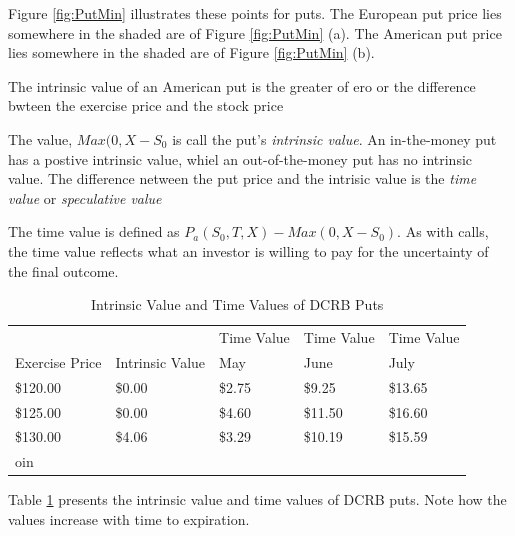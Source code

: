 \documentclass{book}
\theoremstyle{definition}
\theoremstyle{remark}
\begin{document}
            Figure \ref{fig:PutMin} illustrates these points for puts. The European put price lies somewhere in the shaded are of Figure \ref{fig:PutMin} (a). The American put price lies somewhere in the shaded are of Figure \ref{fig:PutMin} (b).
            
        \begin{tcolorbox}[colback=blue!5!white,colframe=blue!75!black, title=Sticky Note]
            The intrinsic value of an American put is the greater of ero or the difference bwteen the exercise price and the stock price 
        \end{tcolorbox} 
           
            The value, $Max(0, X -S_0$ is call the put's \textit{intrinsic value}. An in-the-money put has a postive intrinsic value, whiel an out-of-the-money put has no intrinsic value. The difference netween the put price and the intrisic value is the \textit{time value} or \textit{speculative value}
            
            The time value is defined as $P_a(S_0,T,X) - Max(0, X - S_0)$. As with calls, the time value reflects what an investor is willing to pay for the uncertainty of the final outcome. 
         
                \begin{table}[h]
                    \centering
                    \caption{Intrinsic Value and Time Values of DCRB Puts}
                    \label{tab:PutTime}
                    \begin{tabular}[h]{lllll}
                    \toprule
                        & & Time Value & Time Value & Time Value \\
                        Exercise Price & Intrinsic Value & May & June & July \\
                    \midrule
                        \$120.00 & \$0.00 & \$2.75 & \$9.25 & \$13.65 \\
                        \$125.00 & \$0.00 & \$4.60 & \$11.50 & \$16.60 \\
                        \$130.00 & \$4.06 & \$3.29 & \$10.19 & \$15.59 \\
                    \bottomrule
        oin            \end{tabular}
                \end{table}            
    
            Table \ref{tab:PutTime} presents the intrinsic value and time values of DCRB puts. Note how the values increase with time to expiration. 
            
\end{document}

